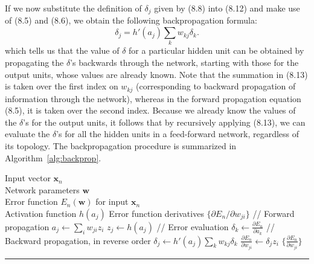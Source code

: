 \documentclass{article}
\begin{document}
If we now substitute the definition of $\delta_j$ given by (8.8) into (8.12) and make use of (8.5) and (8.6), we obtain the following backpropagation formula:
\begin{equation}
    \delta_j = h'(a_j) \sum_k w_{kj} \delta_k.
    \tag{8.13}
\end{equation}
which tells us that the value of $\delta$ for a particular hidden unit can be obtained by propagating the $\delta$'s backwards through the network, starting with those for the output units, whose values are already known. Note that the summation in (8.13) is taken over the first index on $w_{kj}$ (corresponding to backward propagation of information through the network), whereas in the forward propagation equation (8.5), it is taken over the second index. Because we already know the values of the $\delta$'s for the output units, it follows that by recursively applying (8.13), we can evaluate the $\delta$'s for all the hidden units in a feed-forward network, regardless of its topology. The backpropagation procedure is summarized in Algorithm~\ref{alg:backprop}.

\begin{algorithm}[H]
\caption{Backpropagation}
\label{alg:backprop}
\begin{algorithmic}[1]
\Require Input vector $\mathbf{x}_n$ \\
         Network parameters $\mathbf{w}$ \\
         Error function $E_n(\mathbf{w})$ for input $\mathbf{x}_n$ \\
         Activation function $h(a_j)$
\Ensure Error function derivatives $\{\partial E_n / \partial w_{ji}\}$
\State // Forward propagation
    \State $a_j \leftarrow \sum_i w_{ji} z_i$ 
    \State $z_j \leftarrow h(a_j)$ 
\EndFor
\State // Error evaluation
    \State $\delta_k \leftarrow \frac{\partial E_n}{\partial a_k}$ 
\EndFor
\State // Backward propagation, in reverse order
    \State $\delta_j \leftarrow h'(a_j) \sum_k w_{kj} \delta_k$ 
    \State $\frac{\partial E_n}{\partial w_{ji}} \leftarrow \delta_j z_i$ 
\EndFor
\State \Return $\{\frac{\partial E_n}{\partial w_{ji}}\}$
\end{algorithmic}
\end{algorithm}

\noindent\rule{\linewidth}{0.4pt}
\end{document}
